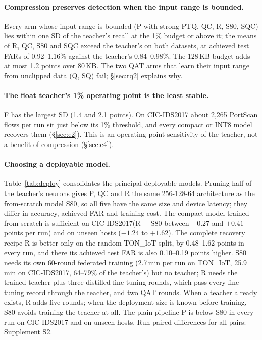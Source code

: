 \documentclass[sigplan,10pt,review,anonymous,nonacm]{acmart}
\newcommand{\cic}{CIC-IDS2017\xspace}
\newcommand{\ton}{TON\_IoT\xspace}
\begin{document}
\paragraph{Compression preserves detection when the input range is bounded.} Every arm whose input
range is bounded (P with strong PTQ, QC, R, S80, SQC) lies within one SD of the teacher's recall at the
1\% budget or above it; the means of R, QC, S80 and SQC exceed the teacher's on both datasets, at achieved
test FARs of 0.92--1.16\% against the teacher's 0.84--0.98\%. The 128\,KB budget adds at most 1.2 points
over 80\,KB. The two QAT arms that learn their input range from unclipped data (Q, SQ) fail;
\S\ref{sec:rq2} explains why.

\paragraph{The float teacher's 1\% operating point is the least stable.} F has the largest SD (1.4 and
2.1 points). On \cic about 2,265 PortScan flows per run sit just below its 1\% threshold, and every
compact or INT8 model recovers them (\S\ref{sec:e2}). This is an operating-point sensitivity of the
teacher, not a benefit of compression (\S\ref{sec:e4}).

\paragraph{Choosing a deployable model.} Table~\ref{tab:deploy} consolidates the principal deployable
models. Pruning half of the teacher's neurons gives P, QC and R the same 256-128-64 architecture as the
from-scratch model S80, so all five have the same size and device latency; they differ in accuracy,
achieved FAR and training cost. The compact model trained from scratch is sufficient on \cic (R $-$ S80
between $-0.27$ and $+0.41$ points per run) and on unseen hosts ($-1.24$ to $+1.62$). The complete recovery
recipe R is better only on the random \ton split, by 0.48--1.62 points in every run, and there its
achieved test FAR is also 0.10--0.19 points higher. S80 needs its own 60-round federated training
(2.7\,min per run on \ton, 25.9\,min on \cic, 64--79\% of the teacher's) but no teacher; R needs the
trained teacher plus three distilled fine-tuning rounds, which pass every fine-tuning record through the
teacher, and two QAT rounds. When a teacher already exists, R adds five rounds; when the deployment size
is known before training, S80 avoids training the teacher at all. The plain pipeline P is below S80 in
every run on \cic and on unseen hosts. Run-paired differences for all pairs: Supplement S2.
\end{document}
